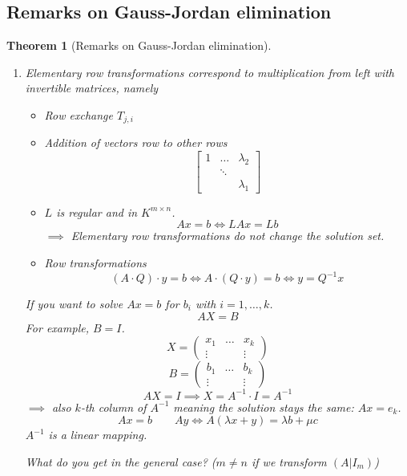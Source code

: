 \documentclass[a4paper,landscape,twocolumn]{article}
\newtheorem{theorem}{Theorem}[section]
\begin{document}
\subsection{Remarks on Gauss-Jordan elimination}
\begin{theorem}[Remarks on Gauss-Jordan elimination]
  \label{satz-6.45}
  \begin{enumerate}
    \item Elementary row transformations correspond to multiplication from left with invertible matrices, namely
      \begin{itemize}
        \item Row exchange $T_{j,i}$
        \item Addition of vectors row to other rows
          \[
            \begin{bmatrix}
              1 & \ldots & \lambda_2 \\
                & \ddots & \\
                &        & \lambda_1
            \end{bmatrix}
          \]
        \item $L$ is regular and in $K^{m\times n}$.
          \[ Ax = b \iff LAx = Lb \]
          $\implies$ Elementary row transformations do not change the solution set.
        \item Row transformations
          \[ (A \cdot Q) \cdot y = b \iff A \cdot (Q \cdot y) = b \iff y = Q^{-1} x \]
      \end{itemize}
      If you want to solve $Ax = b$ for $b_i$ with $i = 1, \ldots, k$.
      \[ AX = B \]
      For example, $B = I$.
      \[
        X =
        \begin{pmatrix}
          x_1 & \ldots & x_k \\
          \vdots &  & \vdots
        \end{pmatrix}
      \] \[
        B =
        \begin{pmatrix}
          b_1 & \ldots & b_k \\
          \vdots &  & \vdots
        \end{pmatrix}
      \]
      \[ AX = I \implies X = A^{-1} \cdot I = A^{-1} \]
      $\implies$ also $k$-th column of $A^{-1}$ meaning the solution stays the same: $Ax = e_k$.
      \[ Ax = b \qquad Ay \iff A(\lambda x + y) = \lambda b + \mu c \]
      $A^{-1}$ is a linear mapping.

      What do you get in the general case? ($m \neq n$ if we transform $(A | I_m)$)
  \end{enumerate}
\end{theorem}
\end{document}
